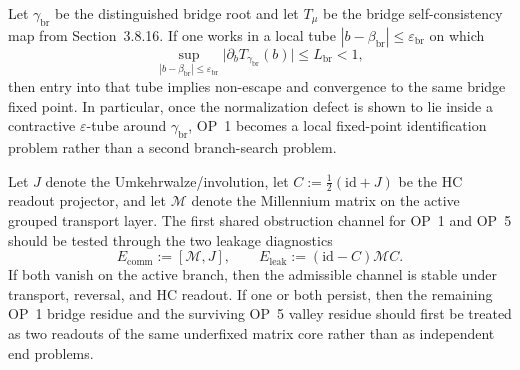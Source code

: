 \begin{description}[leftmargin=2.2em, labelindent=0pt, itemsep=0.5em]
  \item[OP~1 epsilon-bridge tool.] Let \(\gamma_{\mathrm{br}}\) be the distinguished bridge root and let \(T_\mu\) be the bridge self-consistency map from Section~3.8.16. If one works in a local tube \(|b-\beta_{\mathrm{br}}|\le \varepsilon_{\mathrm{br}}\) on which
  \[
    \sup_{|b-\beta_{\mathrm{br}}|\le \varepsilon_{\mathrm{br}}}\bigl|\partial_b T_{\gamma_{\mathrm{br}}}(b)\bigr|\le L_{\mathrm{br}}<1,
  \]
  then entry into that tube implies non-escape and convergence to the same bridge fixed point. In particular, once the normalization defect is shown to lie inside a contractive \(\varepsilon\)-tube around \(\gamma_{\mathrm{br}}\), OP~1 becomes a local fixed-point identification problem rather than a second branch-search problem.
  \item[Shared matrix-leakage tool.] Let \(J\) denote the Umkehrwalze/involution, let \(C:=\tfrac12(\mathrm{id}+J)\) be the HC readout projector, and let \(\mathcal M\) denote the Millennium matrix on the active grouped transport layer. The first shared obstruction channel for OP~1 and OP~5 should be tested through the two leakage diagnostics
  \[
    E_{\mathrm{comm}}:=[\mathcal M,J],
    \qquad
    E_{\mathrm{leak}}:=(\mathrm{id}-C)\mathcal M C.
  \]
  If both vanish on the active branch, then the admissible channel is stable under transport, reversal, and HC readout. If one or both persist, then the remaining OP~1 bridge residue and the surviving OP~5 valley residue should first be treated as two readouts of the same underfixed matrix core rather than as independent end problems.


\end{description}

